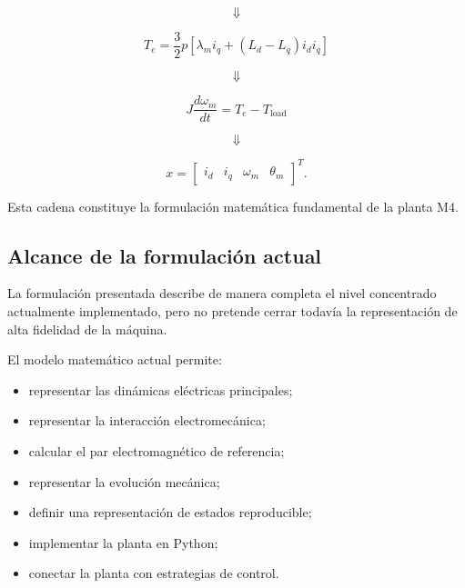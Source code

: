 \begin{equation}
\Downarrow
\end{equation}

\begin{equation}
T_e=
\frac{3}{2}p
\left[
\lambda_mi_q+
(L_d-L_q)i_di_q
\right]
\end{equation}

\begin{equation}
\Downarrow
\end{equation}

\begin{equation}
J\frac{d\omega_m}{dt}
=
T_e-T_{\mathrm{load}}
\end{equation}

\begin{equation}
\Downarrow
\end{equation}

\begin{equation}
x=
\begin{bmatrix}
i_d&i_q&\omega_m&\theta_m
\end{bmatrix}^{T}.
\end{equation}

Esta cadena constituye la formulación matemática fundamental de la planta M4.

\subsection{Alcance de la formulación actual}

La formulación presentada describe de manera completa el nivel concentrado actualmente implementado, pero no pretende cerrar todavía la representación de alta fidelidad de la máquina.

El modelo matemático actual permite:

\begin{itemize}
    \item representar las dinámicas eléctricas principales;
    \item representar la interacción electromecánica;
    \item calcular el par electromagnético de referencia;
    \item representar la evolución mecánica;
    \item definir una representación de estados reproducible;
    \item implementar la planta en Python;
    \item conectar la planta con estrategias de control.
\end{itemize}

